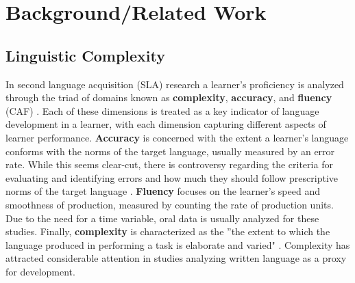 \chapter{Background/Related Work}

\section{Linguistic Complexity}


In second language acquisition (SLA) research a learner's proficiency is analyzed through the triad of domains known
as \textbf{complexity}, \textbf{accuracy}, and \textbf{fluency} (CAF) \citep{Skehan1989,ellis2003}. Each of these
dimensions is treated as a key indicator of language development in a learner, with each dimension capturing different
aspects of learner performance. \textbf{Accuracy} is concerned with the extent a learner's language conforms with
the norms of the target language, usually measured by an error rate. While this seems clear-cut, there is
controversy regarding the criteria for evaluating and identifying errors and how much they should follow
prescriptive norms of the target language \citep{housen2009}. \textbf{Fluency} focuses on the learner's
speed and smoothness of production, measured by counting the rate of production units. Due to the need for a time
variable, oral data is usually analyzed for these studies. Finally,
\textbf{complexity} is characterized as the ”the extent to which the language
produced in performing a task is elaborate
and varied" \citep{ellis2003}. Complexity has attracted considerable attention
in studies analyzing written language as a proxy for development.

